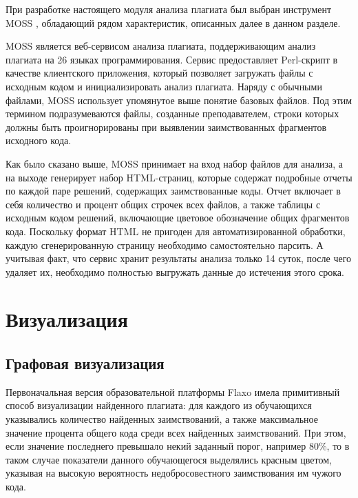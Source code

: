 \documentclass{article}
\begin{document}
При разработке настоящего модуля анализа плагиата был выбран инструмент MOSS \citep{mossOriginalPaper}, обладающий рядом характеристик, описанных далее в данном разделе.

MOSS является веб-сервисом анализа плагиата, поддерживающим анализ плагиата на 26 языках программирования. Сервис предоставляет Perl-скрипт в качестве клиентского приложения, который позволяет загружать файлы с исходным кодом и инициализировать анализ плагиата. Наряду с обычными файлами, MOSS использует упомянутое выше понятие базовых файлов. Под этим термином подразумеваются файлы, созданные преподавателем, строки которых должны быть проигнорированы при выявлении заимствованных фрагментов исходного кода.

Как было сказано выше, MOSS принимает на вход набор файлов для анализа, а на выходе генерирует набор HTML-страниц, которые содержат подробные отчеты по каждой паре решений, содержащих заимствованные коды. Отчет включает в себя количество и процент общих строчек всех файлов, а также таблицы с исходным кодом решений, включающие цветовое обозначение общих фрагментов кода. Поскольку формат HTML не пригоден для автоматизированной обработки, каждую сгенерированную страницу необходимо самостоятельно парсить. А учитывая факт, что сервис хранит результаты анализа только 14 суток, после чего удаляет их, необходимо полностью выгружать данные до истечения этого срока.

\section{Визуализация}

\subsection{Графовая визуализация}

Первоначальная версия образовательной платформы Flaxo имела примитивный способ визуализации найденного плагиата: для каждого из обучающихся указывались количество найденных заимствований, а также максимальное значение процента общего кода среди всех найденных заимствований. При этом, если значение последнего превышало некий заданный порог, например 80\%, то в таком случае показатели данного обучающегося выделялись красным цветом, указывая на высокую вероятность недобросовестного заимствования им чужого кода.
\end{document}
